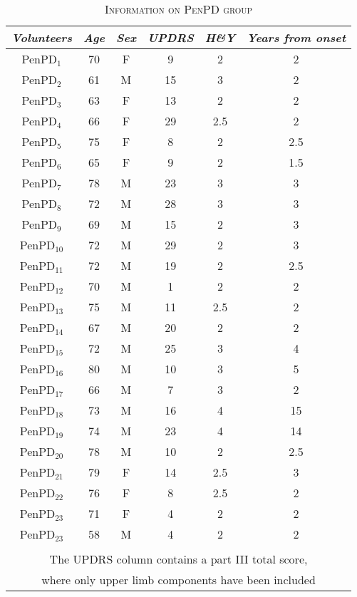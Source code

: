 \begin{table}[!hp]
\centering
\caption{\textsc{Information on PenPD group}}
\begin{tabular*}{1\textwidth}{@{\extracolsep{\fill}} c c c c c c }
	\textit{Volunteers} & \textit{Age} & \textit{Sex} & \textit{UPDRS} & \textit{H\&Y} & \textit{Years from onset} \\
	\hline 	\hline 
 	\gls{PenPD}$_{1}$ & 70 & F & 9 & 2 & 2 \\
 	\gls{PenPD}$_{2}$ & 61 & M & 15 & 3 & 2 \\
 	\gls{PenPD}$_{3}$ & 63 & F & 13 & 2 & 2 \\
 	\gls{PenPD}$_{4}$ & 66 & F & 29 & 2.5 & 2 \\
 	\gls{PenPD}$_{5}$ & 75 & F & 8 & 2 & 2.5 \\
 	\gls{PenPD}$_{6}$ & 65 & F & 9 & 2 & 1.5 \\
 	\gls{PenPD}$_{7}$ & 78 & M & 23 & 3 & 3 \\
 	\gls{PenPD}$_{8}$ & 72 & M & 28 & 3 & 3 \\
 	\gls{PenPD}$_{9}$ & 69 & M & 15 & 2 & 3 \\
 	\gls{PenPD}$_{10}$ & 72 & M & 29 & 2 & 3 \\
 	\gls{PenPD}$_{11}$ & 72 & M & 19 & 2 & 2.5 \\
 	\gls{PenPD}$_{12}$ & 70 & M & 1 & 2 & 2 \\
 	\gls{PenPD}$_{13}$ & 75 & M & 11 & 2.5 & 2 \\
 	\gls{PenPD}$_{14}$ & 67 & M & 20 & 2 & 2 \\
 	\gls{PenPD}$_{15}$ & 72 & M & 25 & 3 & 4 \\
 	\gls{PenPD}$_{16}$ & 80 & M & 10 & 3 & 5 \\
 	\gls{PenPD}$_{17}$ & 66 & M & 7 & 3 & 2 \\
 	\gls{PenPD}$_{18}$ & 73 & M & 16 & 4 & 15 \\
 	\gls{PenPD}$_{19}$ & 74 & M & 23 & 4 & 14 \\
 	\gls{PenPD}$_{20}$ & 78 & M & 10 & 2 & 2.5 \\
 	\gls{PenPD}$_{21}$ & 79 & F & 14 & 2.5 & 3 \\
 	\gls{PenPD}$_{22}$ & 76 & F & 8 & 2.5 & 2 \\
 	\gls{PenPD}$_{23}$ & 71 & F & 4 & 2 & 2 \\
 	\gls{PenPD}$_{23}$ & 58 & M & 4 & 2 & 2 \\
 	& & & & & \\
	\multicolumn{6}{c}{The \gls{UPDRS} column contains a part III total score,} \\
	\multicolumn{6}{c}{where only upper limb components have been included} \\
\end{tabular*}
\label{table:demoPenCT2}
\end{table}

